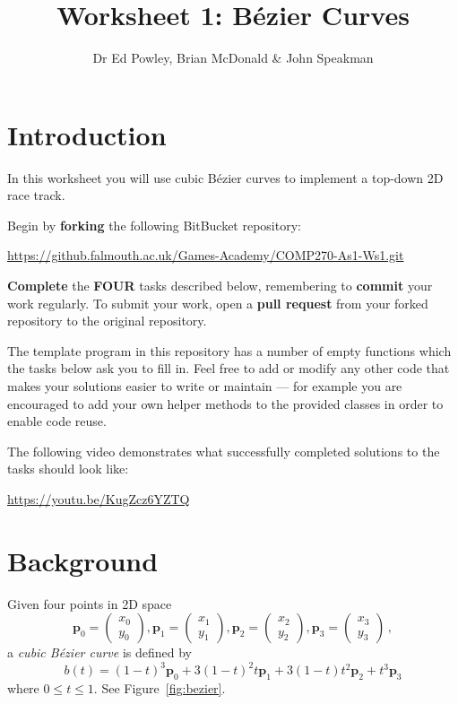 \documentclass{../../../fal_assignment}
\title{Worksheet 1: B\'ezier Curves}
\author{Dr Ed Powley, Brian McDonald \& John Speakman}
\newcommand{\colvec}[2]{\begin{pmatrix}#1\\#2\end{pmatrix}}
\newcommand{\colxy}[1]{\colvec{x_{#1}}{y_{#1}}}
\begin{document}
\maketitle

\section*{Introduction}

In this worksheet you will use cubic B\'ezier curves to implement a top-down 2D race track.

Begin by \textbf{forking} the following BitBucket repository:

\begin{center}
	\url{https://github.falmouth.ac.uk/Games-Academy/COMP270-As1-Ws1.git}
\end{center}

\textbf{Complete} the \textbf{FOUR} tasks described below, remembering to \textbf{commit} your work regularly.
To submit your work, open a \textbf{pull request} from your forked repository to the original repository.

The template program in this repository has a number of empty functions which the tasks below ask you to fill in. Feel free to add or modify any other code that makes your solutions easier to write or maintain ---
for example you are encouraged to add your own helper methods to the provided classes in order to enable code reuse.

The following video demonstrates what successfully completed solutions to the tasks should look like:

\begin{center}
	\url{https://youtu.be/KugZcz6YZTQ}
\end{center}

\section*{Background}

Given four points in 2D space
$$ \mathbf{p}_0 = \colxy0, \mathbf{p}_1 = \colxy1, \mathbf{p}_2 = \colxy2, \mathbf{p}_3 = \colxy3 \,, $$
a \emph{cubic B\'ezier curve} is defined by
$$ b(t) = (1-t)^3 \mathbf{p}_0 + 3(1-t)^2t \mathbf{p}_1 + 3(1-t)t^2 \mathbf{p}_2 + t^3 \mathbf{p}_3 $$
where $0 \leq t \leq 1$. See Figure~\ref{fig:bezier}.
\end{document}
